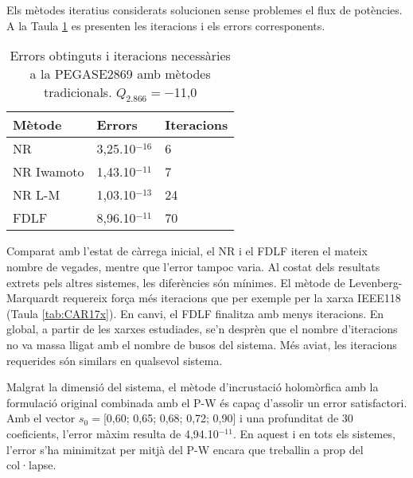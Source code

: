Els mètodes iteratius considerats solucionen sense problemes el flux de potències. A la Taula \ref{tab:CAR20} es presenten les iteracions i els errors corresponents. 

\begin{table}[!htb]
  \begin{center}
  \begin{tabular}{lll}
  \hline
  Mètode & Errors & Iteracions\\
  \hline
  \hline
  NR & 3,25.10$^{-16}$ & 6\\ 
  NR Iwamoto & 1,43.10$^{-11}$ & 7\\
  NR L-M & 1,03.10$^{-13}$ & 24\\ 
  FDLF & 8,96.10$^{-11}$ & 70\\
  \hline 
  \end{tabular}
  \caption{Errors obtinguts i iteracions necessàries a la PEGASE2869 amb mètodes tradicionals. $Q_{2.866}=-$11,0}
  \label{tab:CAR20}
  \end{center}
\end{table}

Comparat amb l'estat de càrrega inicial, el NR i el FDLF iteren el mateix nombre de vegades, mentre que l'error tampoc varia. Al costat dels resultats extrets pels altres sistemes, les diferències són mínimes. El mètode de Levenberg-Marquardt requereix força més iteracions que per exemple per la xarxa IEEE118 (Taula \ref{tab:CAR17x}). En canvi, el FDLF finalitza amb menys iteracions. En global, a partir de les xarxes estudiades, se'n desprèn que el nombre d'iteracions no va massa lligat amb el nombre de busos del sistema. Més aviat, les iteracions requerides són similars en qualsevol sistema.

Malgrat la dimensió del sistema, el mètode d'incrustació holomòrfica amb la formulació original combinada amb el P-W és capaç d'assolir un error satisfactori. Amb el vector $s_0=$[0,60; 0,65; 0,68; 0,72; 0,90] i una profunditat de 30 coeficients, l'error màxim resulta de 4,94.10$^{-11}$. En aquest i en tots els sistemes, l'error s'ha minimitzat per mitjà del P-W encara que treballin a prop del col·lapse.